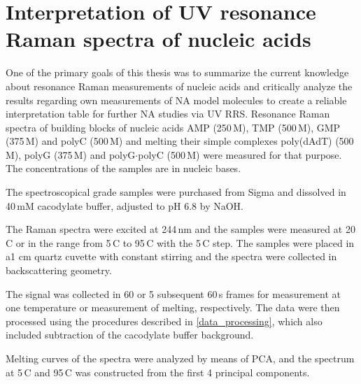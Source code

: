 \section{Interpretation of UV resonance Raman spectra of nucleic acids}
\label{interpretation}

\newlength{\assignwnl}
\settowidth{\assignwnl}{0000}
\newlength{\assignwnil}
\settowidth{\assignwnil}{(000)}
\newlength{\assignwnspl}
\setlength{\assignwnspl}{0.2cm}
\newlength{\assigntabrowindent}
\setlength{\assigntabrowindent}{.7em}


One of the primary goals of this thesis was to summarize the current knowledge
about resonance Raman measurements of nucleic acids and critically analyze the
results regarding own measurements of NA model molecules to
create a reliable interpretation table for further NA studies via UV RRS.
Resonance Raman spectra of building blocks of nucleic acids AMP (250\,M),
TMP (500\,M), GMP (375\,M) and polyC (500\,M) and melting their
simple complexes poly(dAdT) (500\,M), polyG (375\,M) and
polyG$\cdot$polyC (500\,M) were measured for that purpose.
The concentrations of the samples are in nucleic bases.

The spectroscopical grade samples were purchased from Sigma and dissolved in
40\,mM cacodylate buffer, adjusted to pH 6.8 by NaOH.

The Raman spectra were excited at 244\,nm and the samples were measured at
20\,\textdegree{}C or in the range from 5\,\textdegree{}C to 95\,\textdegree{}C
with the 5\,\textdegree{}C step. The samples were placed in  a1 cm quartz
cuvette with constant stirring and the spectra were collected in backscattering
geometry.

The signal was collected in 60 or 5 subsequent 60\,s frames for measurement
at one temperature or measurement of melting, respectively.
The data were then processed using the procedures described in
\cref{data_processing},
which also included subtraction of the cacodylate buffer background.

Melting curves of the spectra were analyzed by means of PCA, and the spectrum
at 5\,\textdegree{}C and 95\,\textdegree{}C was constructed from the first 4
principal components.

